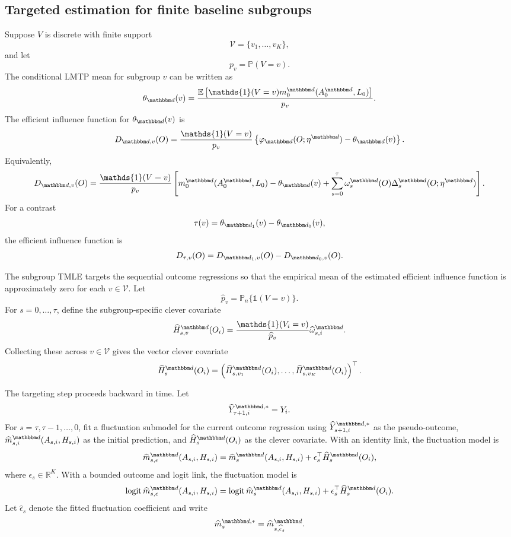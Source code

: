 \documentclass[11pt]{article}
\begin{document}
\subsection{Targeted estimation for finite baseline subgroups}
\label{subsec:subgroup-tmle}

Suppose \(V\) is discrete with finite support
\[
  \mathcal V = \{v_1,\ldots,v_K\},
\]
and let
\[
  p_v = \mathbb{P}(V=v).
\]
The conditional LMTP mean for subgroup \(v\) can be written as
\[
  \theta_{\mathbbm d}(v)
  =
  \frac{
    \mathbb{E}
    \left[
      \mathds{1}(V=v)
      m_0^{\mathbbm d}(A_0^{\mathbbm d},L_0)
    \right]
  }{
    p_v
  }.
\]
The efficient influence function for \(\theta_{\mathbbm d}(v)\) is
\[
  D_{\mathbbm d,v}(O)
  =
  \frac{\mathds{1}(V=v)}{p_v}
  \left\{
    \varphi_{\mathbbm d}(O;\eta^{\mathbbm d})
    -
    \theta_{\mathbbm d}(v)
  \right\}.
\]
Equivalently,
\[
  D_{\mathbbm d,v}(O)
  =
  \frac{\mathds{1}(V=v)}{p_v}
  \left[
    m_0^{\mathbbm d}(A_0^{\mathbbm d},L_0)
    -
    \theta_{\mathbbm d}(v)
    +
    \sum_{s=0}^{\tau}
    \omega_s^{\mathbbm d}(O)
    \Delta_s^{\mathbbm d}(O;\eta^{\mathbbm d})
  \right].
\]
For a contrast
\[
  \tau(v)
  =
  \theta_{\mathbbm d_1}(v)-\theta_{\mathbbm d_0}(v),
\]
the efficient influence function is
\[
  D_{\tau,v}(O)
  =
  D_{\mathbbm d_1,v}(O)
  -
  D_{\mathbbm d_0,v}(O).
\]

The subgroup TMLE targets the sequential outcome regressions so that the
empirical mean of the estimated efficient influence function is approximately
zero for each \(v\in\mathcal V\). Let
\[
  \widehat p_v
  =
  \mathbb{P}_n\{\mathds{1}(V=v)\}.
\]
For \(s=0,\ldots,\tau\), define the subgroup-specific clever covariate
\[
  \widehat H_{s,v}^{\mathbbm d}(O_i)
  =
  \frac{\mathds{1}(V_i=v)}{\widehat p_v}
  \widehat\omega_{s,i}^{\mathbbm d}.
\]
Collecting these across \(v\in\mathcal V\) gives the vector clever covariate
\[
  \widehat H_s^{\mathbbm d}(O_i)
  =
  \left(
    \widehat H_{s,v_1}^{\mathbbm d}(O_i),
    \ldots,
    \widehat H_{s,v_K}^{\mathbbm d}(O_i)
  \right)^\top.
\]

The targeting step proceeds backward in time. Let
\[
  \widehat Y_{\tau+1,i}^{\mathbbm d,*}=Y_i.
\]
For \(s=\tau,\tau-1,\ldots,0\), fit a fluctuation submodel for the current
outcome regression using \(\widehat Y_{s+1,i}^{\mathbbm d,*}\) as the pseudo-outcome,
\(\widehat m_{s,i}^{\mathbbm d}(A_{s,i},H_{s,i})\) as the initial prediction, and
\(\widehat H_s^{\mathbbm d}(O_i)\) as the clever covariate. With an identity
link, the fluctuation model is
\[
  \widehat m_{s,\epsilon}^{\mathbbm d}(A_{s,i},H_{s,i})
  =
  \widehat m_{s}^{\mathbbm d}(A_{s,i},H_{s,i})
  +
  \epsilon_s^\top
  \widehat H_s^{\mathbbm d}(O_i),
\]
where \(\epsilon_s\in\mathbb{R}^K\). With a bounded outcome and logit link, the
fluctuation model is
\[
  \operatorname{logit}
  \widehat m_{s,\epsilon}^{\mathbbm d}(A_{s,i},H_{s,i})
  =
  \operatorname{logit}
  \widehat m_{s}^{\mathbbm d}(A_{s,i},H_{s,i})
  +
  \epsilon_s^\top
  \widehat H_s^{\mathbbm d}(O_i).
\]
Let \(\widehat\epsilon_s\) denote the fitted fluctuation coefficient and write
\[
  \widehat m_{s}^{\mathbbm d,*}
  =
  \widehat m_{s,\widehat\epsilon_s}^{\mathbbm d}.
\]
\end{document}
